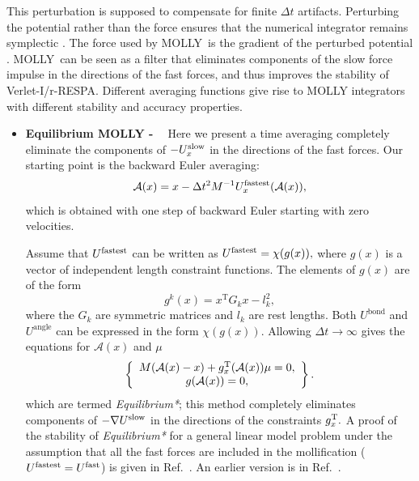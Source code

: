 \documentclass[11pt]{report}
\newcommand{\MOLLY}{\textsc{MOLLY\ }}
\begin{document}
\begin{appendix}
This perturbation is supposed to compensate for finite $\Delta t$
artifacts.  Perturbing the potential rather than the force ensures
that the numerical integrator remains symplectic \cite{SaCa94}. The
force used by \MOLLY is the gradient of the perturbed potential
\cite{IzRS99}. \MOLLY can be seen as a filter that eliminates
components of the slow force impulse in the directions of the fast
forces, and thus improves the stability of Verlet-I/r-RESPA. Different
averaging functions give rise to MOLLY integrators with different
stability and accuracy properties. 

\begin{itemize}

\item {\bf Equilibrium MOLLY - ~\cite{IZAG98}}
 Here we present a time averaging
completely eliminate the components of $-U_{x}^{ {\rm slow}}$ in the
directions of the fast forces. Our starting point is the backward
Euler averaging:
\begin{equation}
{\mathcal A}(x)=x-\Delta t^{2}M^{-1}U_{x}^{\rm fastest}({\mathcal A}(x)),
\end{equation}
which is obtained with one step of backward Euler starting
with zero velocities. 

Assume that $U^{\rm fastest}$ can be written as 
$U^{\rm fastest}=\chi (g(x)),$ 
where $g(x)$ is a vector of independent length constraint functions. 
The elements of $g(x)$ are of the form
\begin{equation}
g^{k}(x)=x^{\mathrm{T}}G_{k}x-l_{k}^{2},
\end{equation}
where the $G_{k}$ are symmetric matrices and $l_k$ are rest lengths. 
Both $U^\mathrm{bond}$ and $U^\mathrm{angle}$ can be expressed in the
form $\chi(g(x))$. Allowing $\Delta t\rightarrow \infty $ gives the
equations for 
${\mathcal A}(x)$ and $\mu$ 
\begin{equation}
\left\{ 
\begin{array}{c}
M({\mathcal A}(x)-x)+g_{x}^{{\rm T}}({\mathcal A}(x))\mu =0, \\ 
g({\mathcal A}(x))=0,
\end{array}
\right\}.  
\label{eq:ultrazero}
\end{equation}
which are termed {\em Equilibrium*}; this method completely eliminates
components of $-\nabla U^{{\rm slow}}$ in the directions of the
constraints $ g_{x}^{{\rm T}}.$ A proof of the stability of {\em
Equilibrium*} for a general linear model problem under the assumption
that all the fast forces are included in the mollification ($U^{ {\rm
fastest}}=U^{{\rm fast}}$) is given in Ref.~\cite{Izag99b}. An
earlier version is in Ref.~\cite{Reic98}. 


\end{itemize}
\end{appendix}
\end{document}
